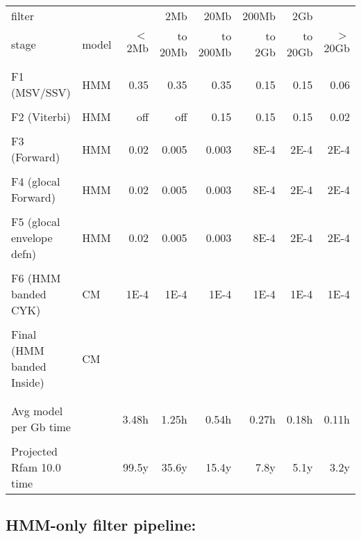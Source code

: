\begin{table}
\begin{tabular}{ll||r|r|r|r|r|r|}
filter &               &         & 2Mb     & 20Mb     & 200Mb  & 2Gb     &          \\
stage  & model         & $<$ 2Mb & to 20Mb & to 200Mb & to 2Gb & to 20Gb & $>$ 20Gb \\  \hline
& & & & & & & \\
F1 (MSV/SSV) & HMM & 0.35 & 0.35 & 0.35 & 0.15 & 0.15 & 0.06 \\
& & & & & & & \\
F2 (Viterbi) & HMM & off & off & 0.15 & 0.15 & 0.15 & 0.02 \\
& & & & & & & \\
F3 (Forward) & HMM & 0.02 & 0.005 & 0.003 & 8E-4 & 2E-4 & 2E-4 \\
& & & & & & & \\
F4 (glocal Forward) & HMM & 0.02 & 0.005 & 0.003 & 8E-4 & 2E-4 & 2E-4 \\
& & & & & & & \\
F5 (glocal envelope defn)  & HMM & 0.02 & 0.005 & 0.003 & 8E-4 & 2E-4 & 2E-4 \\
& & & & & & & \\
F6 (HMM banded CYK)  & CM & 1E-4 & 1E-4 & 1E-4 & 1E-4 & 1E-4 & 1E-4 \\
& & & & & & & \\
Final (HMM banded Inside)& CM &  & & & & & \\ \hline
& & & & & & & \\
& & & & & & & \\
Avg model per Gb time   & & 3.48h & 1.25h & 0.54h & 0.27h & 0.18h & 0.11h \\
& & & & & & & \\
Projected Rfam 10.0 time  & & 99.5y & 35.6y & 15.4y & 7.8y & 5.1y & 3.2y \\
\end{tabular}
\end{table}

\subsection{HMM-only filter pipeline:}

